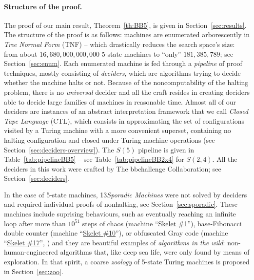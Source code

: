 \documentclass[a4paper,british]{article}
\theoremstyle{definition} %
\numberwithin{equation}{section}
\theoremstyle{definition} %
\newcommand{\BBtheFifthTNF}{181{,}385{,}789}
\newcommand{\numSporadic}{13\xspace}
\begin{document}
\paragraph{Structure of the proof.} The proof of our main result, Theorem~\ref{th:BB5}, is given in Section~\ref{sec:results}. The structure of the proof is as follows: machines are enumerated arborescently in \textit{Tree Normal Form} (TNF) \cite{Brady64} -- which drastically reduces the search space's size: from about $16,680,000,000,000$ 5-state machines to ``only'' $\BBtheFifthTNF$; see Section~\ref{sec:enum}. Each enumerated machine is fed through a \textit{pipeline} of proof techniques, mostly consisting of \textit{deciders}, which are algorithms trying to decide whether the machine halts or not. Because of the noncomputability of the halting problem, there is no \textit{universal} decider and all the craft resides in creating deciders able to decide large families of machines in reasonable time. Almost all of our deciders are instances of an abstract interpretation framework that we call \textit{Closed Tape Language} (CTL), which consists in approximating the set of configurations visited by a Turing machine with a more convenient superset, containing no halting configuration and closed under Turing machine operations (see Section~\ref{sec:deciders-overview}). The $S(5)$ pipeline is given in Table~\ref{tab:pipelineBB5} -- see Table~\ref{tab:pipelineBB2x4} for $S(2,4)$. All the deciders in this work were crafted by The bbchallenge Collaboration; see Section~\ref{sec:deciders}.

In the case of 5-state machines, \numSporadic \textit{Sporadic Machines} were not solved by deciders and required individual proofs of nonhalting, see Section~\ref{sec:sporadic}. These machines include suprising behaviours, such as eventually reaching an infinite loop after more than $10^{51}$ steps of chaos (machine ``\href{https://bbchallenge.org/1RB1RD_1LC0RC_1RA1LD_0RE0LB_---1RC}{Skelet \#1}''), base-Fibonacci double counter (machine ``\href{https://bbchallenge.org/1RB0RA_0LC1RA_1RE1LD_1LC0LD_---0RB}{Skelet \#10}''), or obfuscated Gray code (machine ``\href{https://bbchallenge.org/1RB---_0LC1RE_0LD1LC_1RA1LB_0RB0RA}{Skelet \#17}'', \cite{xu2024skelet17fifthbusy}) and they are beautiful examples of \textit{algorithms in the wild}: non-human-engineered algorithms that, like deep sea life, were only found by means of exploration. In that spirit, a coarse \textit{zoology} of 5-state Turing machines is proposed in Section~\ref{sec:zoo}.

\newpage
\end{document}
